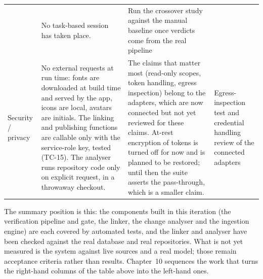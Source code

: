 \begin{longtable}{>{\raggedright\arraybackslash}p{} >{\raggedright\arraybackslash}p{} >{\raggedright\arraybackslash}p{} >{\raggedright\arraybackslash}p{}}
  & No task-based session has taken place.
  & Run the crossover study against the manual baseline once verdicts come from
    the real pipeline \\
Security / privacy & No external requests at run time: fonts are downloaded
  at build time and served by the app, icons are local, avatars are initials.
  The linking and publishing functions are callable only with the service-role
  key, tested (TC-15). The analyser runs repository code only on explicit
  request, in a throwaway checkout.
  & The claims that matter most (read-only scopes, token handling, egress
    inspection) belong to the adapters, which are now connected but not yet
    reviewed for these claims. At-rest encryption of tokens is turned off for
    now and is planned to be restored; until then the suite asserts the
    pass-through, which is a smaller claim.
  & Egress-inspection test and credential handling review of the connected
    adapters \\
\hline\end{longtable}

The summary position is this: the components built in this iteration (the
verification pipeline and gate, the linker, the change analyser and the
ingestion engine) are each covered by automated tests, and the linker and
analyser have been checked against the real database and real repositories.
What is not yet measured is the system against live sources and a real model;
those remain acceptance criteria rather than results. Chapter~10 sequences the
work that turns the right-hand columns of the table above into the left-hand
ones.
